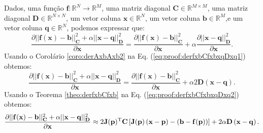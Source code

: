 \begin{myproofT}\label{proof:theo:derfxbCfxbxqDxq}
Dados,
uma função $\mathbf{f}:\mathbb{R}^{N} \rightarrow \mathbb{R}^{M}$, 
uma matriz diagonal $\mathbf{C}\in \mathbb{R}^{M\times M}$, 
uma matriz diagonal $\mathbf{D}\in \mathbb{R}^{N\times N}$, 
um vetor coluna $\mathbf{x}\in \mathbb{R}^{N}$, 
um vetor coluna $\mathbf{b}\in \mathbb{R}^{M}$,e 
um vetor coluna $\mathbf{q}\in \mathbb{R}^{N}$, 
podemos expressar que:
\begin{equation}\label{eq:proof:derfxbCfxbxqDxq1}
\frac{\partial ||\mathbf{f}(\mathbf{x})-\mathbf{b}||_{\mathbf{C}}^2 +\alpha||\mathbf{x}-\mathbf{q}||_{\mathbf{D}}^2}{\partial \mathbf{x}} =
\frac{\partial ||\mathbf{f}(\mathbf{x})-\mathbf{b}||_{\mathbf{C}}^2}{\partial \mathbf{x}}+
\alpha \frac{\partial ||\mathbf{x}-\mathbf{q}||_{\mathbf{D}}^2}{\partial \mathbf{x}}.
\end{equation}
Usando o Corolário \ref{coro:derAxbAxb2} na Eq. (\ref{eq:proof:derfxbCfxbxqDxq1})
obtemos:
\begin{equation}\label{eq:proof:derfxbCfxbxqDxq2}
\frac{\partial ||\mathbf{f}(\mathbf{x})-\mathbf{b}||_{\mathbf{C}}^2 +\alpha||\mathbf{x}-\mathbf{q}||_{\mathbf{D}}^2}{\partial \mathbf{x}} =
\frac{\partial ||\mathbf{f}(\mathbf{x})-\mathbf{b}||_{\mathbf{C}}^2}{\partial \mathbf{x}}+
\alpha 2 \mathbf{D}\left(\mathbf{x}-\mathbf{q}\right).
\end{equation}
Usando o Teorema \ref{theo:derfxbCfxb} na Eq. (\ref{eq:proof:derfxbCfxbxqDxq2})
obtemos:
\begin{equation}\label{eq:proof:derfxbCfxbxqDxq3}
\frac{\partial ||\mathbf{f}(\mathbf{x})-\mathbf{b}||_{\mathbf{C}}^2 +\alpha||\mathbf{x}-\mathbf{q}||_{\mathbf{D}}^2}{\partial \mathbf{x}} \approx
2 \mathbf{J}(\mathbf{p})^{\mathrm{T}}\mathbf{C}\left[\mathbf{J}(\mathbf{p})\left(\mathbf{x} - \mathbf{p}\right)-\left(\mathbf{b}-\mathbf{f}(\mathbf{p})\right)\right]+
2 \alpha \mathbf{D}\left(\mathbf{x}-\mathbf{q}\right).
\end{equation}
\end{myproofT}
%